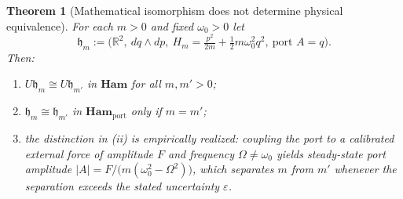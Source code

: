 \documentclass[10pt,a4paper]{article}
\theoremstyle{plain}
\newtheorem{theorem}{Theorem}
\theoremstyle{definition}
\newcommand{\Ham}{\mathbf{Ham}}
\newcommand{\HamP}{\mathbf{Ham}_{\mathrm{port}}}
\newcommand{\R}{\mathbb{R}}
\begin{document}
\begin{theorem}[Mathematical isomorphism does not determine physical equivalence]
\label{thm:noniso}
For each $m>0$ and fixed $\omega_0>0$ let
\[
\mathfrak{h}_m := \Big(\R^2,\ dq\wedge dp,\ H_m = \tfrac{p^2}{2m} + \tfrac12 m\omega_0^2q^2,\ \text{port } A = q\Big).
\]
Then:
\begin{enumerate}[label=(\roman*),leftmargin=2em,itemsep=0pt]
\item $U\mathfrak{h}_m \cong U\mathfrak{h}_{m'}$ in $\Ham$ for all $m,m'>0$;
\item $\mathfrak{h}_m \cong \mathfrak{h}_{m'}$ in $\HamP$ only if $m = m'$;
\item the distinction in (ii) is empirically realized: coupling the port to a calibrated external force of amplitude $F$ and frequency $\Omega \neq \omega_0$ yields steady-state port amplitude $|A| = F/\big(m(\omega_0^2-\Omega^2)\big)$, which separates $m$ from $m'$ whenever the separation exceeds the stated uncertainty $\varepsilon$.
\end{enumerate}
\end{theorem}
\end{document}
